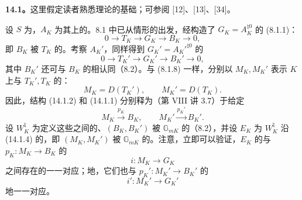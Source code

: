 \textbf{14.1。}这里假定读者熟悉理论的基础；可参阅 [12]、[13]、[34]。

设 $S$ 为，$A_K$ 为其上的。8.1 中已从情形的出发，经构造了 $G_K=A_K^{\natural0}$ 的 (8.1.1)：
\begin{equation}\tag{14.1.1}
0\longrightarrow T_K\longrightarrow G_K\longrightarrow B_K\longrightarrow0,
\end{equation}
即 $B_K$ 被 $T_K$ 的。考察 $A_K'$，同样得到 $G_K'=A_K'^{\natural0}$ 的
\begin{equation}\tag{14.1.2}
0\longrightarrow T_K'\longrightarrow G_K'\longrightarrow B_K'\longrightarrow0,
\end{equation}
其中 $B_K'$ 还可与 $B_K$ 的相认同（8.2）。与 (8.1.8) 一样，分别以 $M_K,M_K'$ 表示 $K$ 上与 $T_K',T_K$ 的：
\begin{equation}\tag{14.1.3}
M_K=D(T_K'),\qquad M_K'=D(T_K).
\end{equation}
因此，结构 (14.1.2) 和 (14.1.1) 分别释为（第 VIII 讲 3.7）于给定
\begin{equation}\tag{14.1.4}
M_K\xrightarrow{p_K}B_K,\qquad M_K'\xrightarrow{p_K'}B_K'.
\end{equation}
设 $W_K^\natural$ 为定义这些之间的、$(B_K,B_K')$ 被 $\mathbb G_{mK}$ 的（8.2），并设 $E_K$ 为 $W_K^\natural$ 沿 (14.1.4) 的，即 $(M_K,M_K')$ 被 $\mathbb G_{mK}$ 的。注意，立即可以验证，$E_K$ 的与 $p_K:M_K\to B_K$ 的
\begin{equation}\tag{14.1.5}
i:M_K\longrightarrow G_K
\end{equation}
之间存在的一一对应；地，它们也与 $p_K':M_K'\to B_K'$ 的
\begin{equation}\tag{14.1.6}
i':M_K'\longrightarrow G_K'
\end{equation}
地一一对应。

